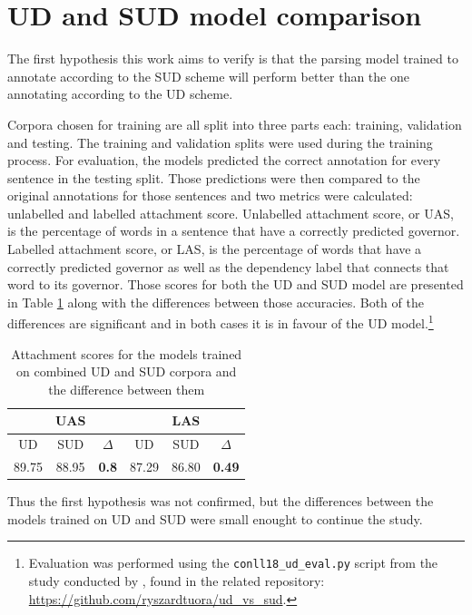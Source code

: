 \section{UD and SUD model comparison}
The first hypothesis this work aims to verify is that the parsing model trained to annotate according to the SUD scheme will perform better than the one annotating according to the UD scheme. 

Corpora chosen for training are all split into three parts each: training, validation and testing. The training and validation splits were used during the training process. For evaluation, the models predicted the correct annotation for every sentence in the testing split. Those predictions were then compared to the original annotations for those sentences and two metrics were calculated: unlabelled and labelled attachment score. Unlabelled attachment score, or UAS, is the percentage of words in a sentence that have a correctly predicted governor. Labelled attachment score, or LAS, is the percentage of words that have a correctly predicted governor as well as the dependency label that connects that word to its governor. Those scores for both the UD and SUD model are presented in Table \ref{tab:mcnemar} along with the differences between those accuracies. Both of the differences are significant and in both cases it is in favour of the UD model.\footnote{Evaluation was performed using the \texttt{conll18\_ud\_eval.py} script from the study conducted by \cite{tuo:prz:lac:21}, found in the related repository: \url{https://github.com/ryszardtuora/ud_vs_sud}.}

\begin{table}[h!]
\centering
\begin{tabular}{|| c c c | c c c ||}
\hline
& UAS & & & LAS & \\
\hline
UD & SUD & $\Delta$ & UD & SUD & $\Delta$ \\
\hline \hline
89.75 & 88.95 & \textbf{0.8} & 87.29 & 86.80 & \textbf{0.49} \\
\hline
\end{tabular}
\caption{\centering Attachment scores for the models trained on combined UD and SUD corpora and the difference between them}\label{tab:mcnemar}
\end{table}

Thus the first hypothesis was not confirmed, but the differences between the models trained on UD and SUD were small enought to continue the study. 

